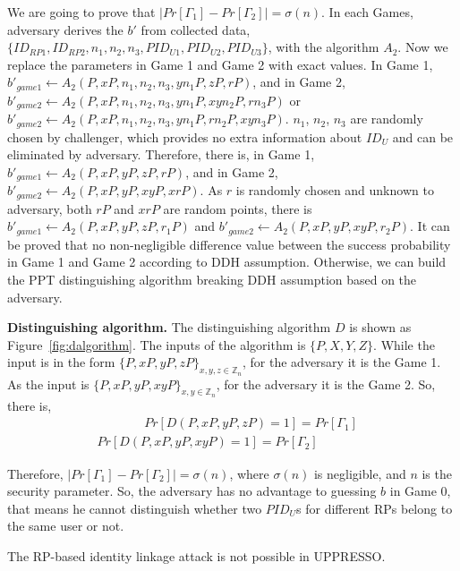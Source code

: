 We are going to prove that $|Pr[\Gamma_1]-Pr[\Gamma_2]|=\sigma(n)$. In each Games, adversary derives the $b'$ from collected data, $\{ID_{RP1},ID_{RP2},n_1,n_2,n_3,PID_{U1},PID_{U2},PID_{U3}\}$, with the algorithm $A_2$. Now we replace the parameters in Game 1 and Game 2 with exact values. In Game 1, $b'_{game1}\gets A_2(P,xP,n_1,n_2,n_3,yn_1P,zP,rP)$, and in Game 2, $b'_{game2}\gets A_2(P,xP,n_1,n_2,n_3,yn_1P,xyn_2P,rn_3P)$ or $b'_{game2}\gets A_2(P,xP,n_1,n_2,n_3,yn_1P,rn_2P,xyn_3P)$.
$n_1$, $n_2$, $n_3$ are randomly chosen by challenger, which provides no extra information about $ID_U$ and can be eliminated by adversary. Therefore, there is, in Game 1, $b'_{game1}\gets A_2(P,xP,yP,zP,rP)$, and in Game 2, $b'_{game2}\gets A_2(P,xP,yP,xyP,xrP)$. As $r$ is randomly chosen and unknown to adversary, both $rP$ and $xrP$ are random points, there is $b'_{game1}\gets A_2(P,xP,yP,zP,r_1P)$ and $b'_{game2}\gets A_2(P,xP,yP,xyP,r_2P)$.  It can be proved that no non-negligible difference value between the success probability in Game 1 and Game 2 according to DDH assumption. Otherwise, we can build the PPT distinguishing algorithm breaking DDH assumption based on the adversary.

\noindent\textbf{Distinguishing algorithm.} The distinguishing algorithm $D$ is shown as Figure~\ref{fig:dalgorithm}.
The inputs of the algorithm is $\{P,X,Y,Z\}$. While the input is in the form $\{P,xP,yP,zP\}_{x,y,z \in \mathbb{Z}_n}$, for the adversary it is the Game 1. As the input is $\{P,xP,yP,xyP\}_{x,y \in \mathbb{Z}_n}$, for the adversary it is the Game 2. So, there is,
\vspace{-\topsep}
\begin{multline*}
   \ \ \ \ \ \ \ \ \ \ \ \ \ \ \ \ \  Pr[D(P,xP,yP,zP)=1]=Pr[{\Gamma_1}]\\
   Pr[D(P,xP,yP,xyP)=1]=Pr[{\Gamma_2}]\ \ \ \ \ \ \ \ \ \ \ \ \ \ \ \ \ \
\end{multline*}

\vspace{-\topsep}
Therefore, $|Pr[\Gamma_1]-Pr[\Gamma_2]|=\sigma(n)$, where $\sigma(n)$ is negligible, and $n$ is the security parameter. So, the adversary has no advantage to guessing $b$ in Game 0, that means he cannot distinguish whether two $PID_U$s for different RPs belong to the same user or not.

The RP-based identity linkage attack is not possible in UPPRESSO.

